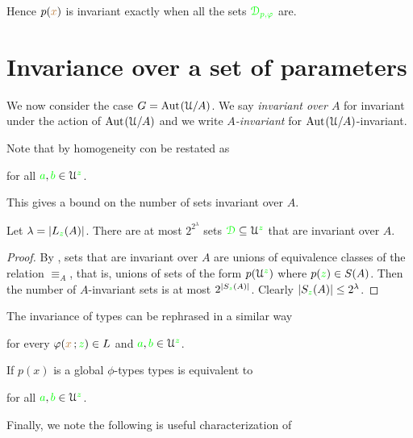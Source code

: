 Hence $p({\color{brown} x})$ is invariant exactly when all the sets $\color{green}\EuScript D_{p,\varphi}$ are.

\section{Invariance over a set of parameters}

We now consider the case $G={\rm Aut\kern.15ex}(\EuScript U/A)$.
We say \emph{invariant over $A$\/} for invariant under the action of ${\rm Aut\kern.15ex}(\EuScript U/A)$ and we write \emph{$A$-invariant\/} for ${\rm Aut\kern.15ex}(\EuScript U/A)$-invariant.

Note that by homogeneity  con be restated as

\hfill for all ${\color{green} a},{\color{green} b}\in\EuScript U^{\color{green} z}$.

This gives a bound on the number of sets invariant over $A$.

\begin{proposition}\label{prop_numberIS}
Let $\lambda=|L_{\color{green} z}(A)|$.
There are at most $2^{2^{\lambda}}$ sets ${\color{green}\EuScript D}\subseteq\EuScript U^{\color{green} z}$ that are invariant over $A$.
\end{proposition}
\begin{proof}
By , sets that are invariant over $A$ are unions of equivalence classes of the relation $\equiv_A$, that is, unions of sets of the form $p(\EuScript U^{\color{green} z})$ where $p({\color{green} z})\in S\/(A)$.
Then the number of $A$-invariant sets is at most $2^{|S_{\color{green} z}(A)|}$.
Clearly $|S_{\color{green} z}(A)|\le 2^\lambda$.
\end{proof} 

The invariance of types can be rephrased in a similar way

\hfill for every $\varphi({\color{brown} x}\,;{\color{green} z})\in L$ and ${\color{green} a},{\color{green} b}\in\EuScript U^{\color{green} z}$.


If $p(x)$ is a global $\phi$-types types  is equivalent to

\hfill for all ${\color{green} a},{\color{green} b}\in\EuScript U^{\color{green} z}$.

Finally, we note the following is useful characterization of 

